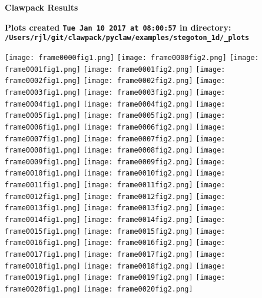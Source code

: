 \documentclass[11pt]{article}
\begin{document}
        \begin{center}{\Large\bf Clawpack Results}\vskip 5pt
        
        \bf Plots created {\tt Tue Jan 10 2017 at 08:00:57} in directory: \vskip 5pt
        \verb+/Users/rjl/git/clawpack/pyclaw/examples/stegoton_1d/_plots+
        \end{center}
        \vskip 5pt
        \texttt{[image: frame0000fig1.png]}
\texttt{[image: frame0000fig2.png]}
\texttt{[image: frame0001fig1.png]}
\texttt{[image: frame0001fig2.png]}
\vskip 10pt 
\texttt{[image: frame0002fig1.png]}
\texttt{[image: frame0002fig2.png]}
\texttt{[image: frame0003fig1.png]}
\texttt{[image: frame0003fig2.png]}
\vskip 10pt 
\texttt{[image: frame0004fig1.png]}
\texttt{[image: frame0004fig2.png]}
\texttt{[image: frame0005fig1.png]}
\texttt{[image: frame0005fig2.png]}
\vskip 10pt 
\texttt{[image: frame0006fig1.png]}
\texttt{[image: frame0006fig2.png]}
\texttt{[image: frame0007fig1.png]}
\texttt{[image: frame0007fig2.png]}
\vskip 10pt 
\texttt{[image: frame0008fig1.png]}
\texttt{[image: frame0008fig2.png]}
\texttt{[image: frame0009fig1.png]}
\texttt{[image: frame0009fig2.png]}
\vskip 10pt 
\texttt{[image: frame0010fig1.png]}
\texttt{[image: frame0010fig2.png]}
\texttt{[image: frame0011fig1.png]}
\texttt{[image: frame0011fig2.png]}
\vskip 10pt 
\texttt{[image: frame0012fig1.png]}
\texttt{[image: frame0012fig2.png]}
\texttt{[image: frame0013fig1.png]}
\texttt{[image: frame0013fig2.png]}
\vskip 10pt 
\texttt{[image: frame0014fig1.png]}
\texttt{[image: frame0014fig2.png]}
\texttt{[image: frame0015fig1.png]}
\texttt{[image: frame0015fig2.png]}
\vskip 10pt 
\texttt{[image: frame0016fig1.png]}
\texttt{[image: frame0016fig2.png]}
\texttt{[image: frame0017fig1.png]}
\texttt{[image: frame0017fig2.png]}
\vskip 10pt 
\texttt{[image: frame0018fig1.png]}
\texttt{[image: frame0018fig2.png]}
\texttt{[image: frame0019fig1.png]}
\texttt{[image: frame0019fig2.png]}
\vskip 10pt 
\texttt{[image: frame0020fig1.png]}
\texttt{[image: frame0020fig2.png]}
\end{document}
